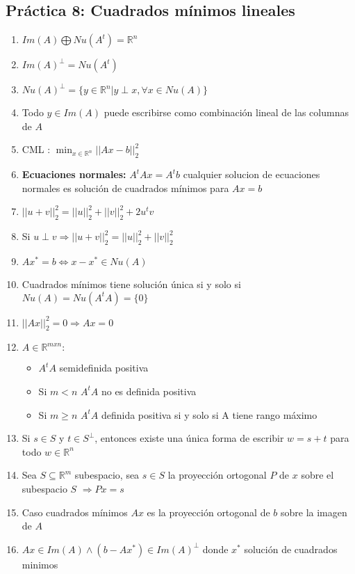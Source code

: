 \subsection*{Práctica 8: Cuadrados mínimos lineales}
\begin{enumerate}
    \item $Im(A) \bigoplus Nu(A^t) = \mathbb{R}^n$
    \item $Im(A)^{\perp} = Nu(A^t)$
    \item $Nu(A)^{\perp} = \{y \in \mathbb{R}^n | y\perp x,  \forall x \in Nu(A)\}$
    \item Todo $y\in Im(A)$ puede escribirse como combinación lineal de las columnas de $A$
    \item CML : $\min_{x\in\mathbb{R}^n} ||Ax-b||_2^2$ 
    \item \textbf{Ecuaciones normales:} $A^tAx=A^tb$ cualquier solucion de ecuaciones normales es solución de cuadrados mínimos para $Ax=b$
    \item $||u+v||_2^2 = ||u||_2^2+||v||_2^2 + 2u^tv$
    \item Si $u\perp v \Rightarrow ||u+v||_2^2 = ||u||_2^2+||v||_2^2$ 
    \item $Ax^*=b \iff x-x^*\in Nu(A)$
    \item Cuadrados mínimos tiene solución única si y solo si $Nu(A) = Nu(A^tA)=\{0\}$
    \item $||Ax||_2^2= 0 \Rightarrow Ax=0$
     \item $A\in\mathbb{R}^{mxn}:$\begin{itemize}
         \item $A^tA$ semidefinida positiva
         \item Si $m<n$ $A^tA$ no es definida positiva
         \item Si $m\geq n$ $A^tA$ definida positiva si y solo si A tiene rango máximo
     \end{itemize}
     \item Si $s\in S$ y $t \in S^{\perp}$, entonces existe una única forma de escribir $w=s+t$ para todo $w\in\mathbb{R}^n$
     \item Sea $S\subseteq \mathbb{R}^m$ subespacio, sea $s \in S$ la proyección ortogonal $P$ de $x$ sobre el subespacio $S$ $\Rightarrow Px=s$
     \item Caso cuadrados mínimos $Ax$ es la proyección ortogonal de $b$ sobre la imagen de $A$
     \item $Ax \in Im(A) \land (b-Ax^*) \in Im(A)^{\perp}$ donde $x^*$ solución de cuadrados minimos
\end{enumerate}
